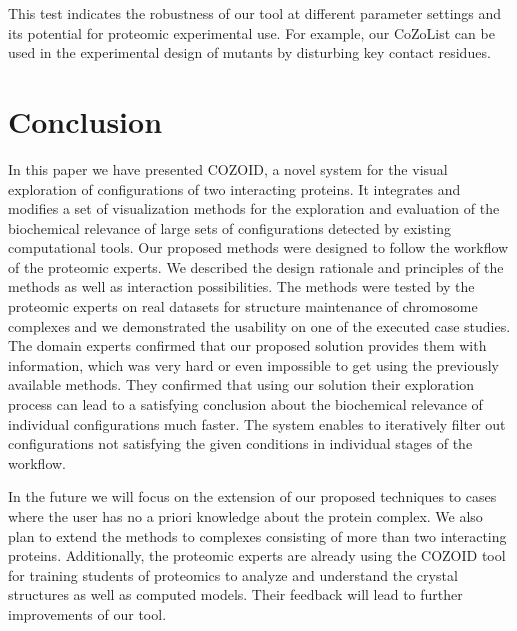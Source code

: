 \documentclass{bmcart}
\begin{document}
This test indicates the robustness of our tool at different parameter settings and its potential for proteomic experimental use. 
For example, our CoZoList can be used in the experimental design of mutants by disturbing key contact residues. 


\section{Conclusion}
In this paper we have presented COZOID, a novel system for the visual exploration of configurations of two interacting proteins. 
It integrates and modifies a set of visualization methods for the exploration and evaluation of the biochemical relevance of large sets of configurations detected by existing computational tools.
Our proposed methods were designed to follow the workflow of the proteomic experts.
We described the design rationale and principles of the methods as well as interaction possibilities. 
The methods were tested by the proteomic experts on real datasets for structure maintenance of chromosome complexes and we demonstrated the usability on one of the executed case studies.
The domain experts confirmed that our proposed solution provides them with information, which was very hard or even impossible to get using the previously available methods.
They confirmed that using our solution their exploration process can lead to a satisfying conclusion about the biochemical relevance of individual configurations much faster.
The system enables to iteratively filter out configurations not satisfying the given conditions in individual stages of the workflow.

In the future we will focus on the extension of our proposed techniques to cases where the user has no a priori knowledge about the protein complex.
We also plan to extend the methods to complexes consisting of more than two interacting proteins. 
Additionally, the proteomic experts are already using the COZOID tool for training students of proteomics to analyze and understand the crystal structures as well as computed models.
Their feedback will lead to further improvements of our tool.

\end{document}
